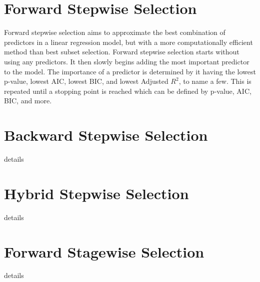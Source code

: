 \documentclass{article}
\begin{document}
\section{Forward Stepwise Selection}
Forward stepwise selection aims to approximate the best combination of predictors in a linear regression model, but with a more computationally efficient method than best subset selection. Forward stepwise selection starts without using any predictors. It then slowly begins adding the most important predictor to the model. The importance of a predictor is determined by it having the lowest p-value, lowest AIC, lowest BIC, and lowest Adjusted $R^2$, to name a few. This is repeated until a stopping point is reached which can be defined by p-value, AIC, BIC, and more.

\section{Backward Stepwise Selection}
details

\section{Hybrid Stepwise Selection}
details

\section{Forward Stagewise Selection}
details



\end{document}
